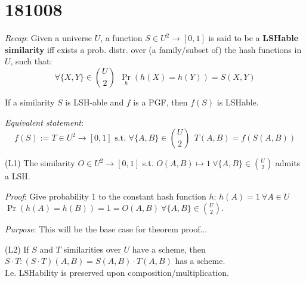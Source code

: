 \section{181008}  %
	
	\textit{Recap}: Given a universe $U$, a function $S \in U^2 \to [0, 1]$ is said to be a \textbf{LSHable similarity} iff exists a prob. distr. over (a family/subset of) the hash functions in $U$, such that: 
	\begin{equation}
	\forall \{X, Y\} \in \binom{U}{2}\ \ \Pr_h(h(X)=h(Y)) = S(X, Y)
	\end{equation}
	
	\thm \label{t:pgf_1} If a similarity $S$ is LSH-able and $f$ is a PGF, then $f(S)$ is LSHable.
	
	\textit{Equivalent statement}:
	\begin{equation}
	f(S) := T \in U^2 \to [0, 1] \text{ s.t. } \forall \{A, B\} \in \binom{U}{2}\ \ T(A, B) = f(S(A, B))
	\end{equation}
	
	
	\lem \label{l:pgf_1} (L1) The similarity $O \in U^2 \to [0, 1]$ s.t. $O(A, B) \mapsto 1 \ \forall \{A, B\} \in \binom{U}{2}$ admits a LSH.
	
	\textit{Proof}: Give probability 1 to the constant hash function $h$: $h(A)=1 \ \forall A\in U$\\
	$\Pr(h(A)=h(B))=1=O(A,B) \ \forall \{A, B\} \in \binom{U}{2}$.
	
	
	\textit{Purpose}: This will be the base case for theorem proof...
	
	\lem \label{l:pgf_2} (L2) If $S$ and $T$ similarities over $U$ have a scheme, then $S \cdot T : (S \cdot T)(A, B) = S(A, B)\cdot T(A, B)$ has a scheme. \\
	I.e. LSHability is preserved upon composition/multiplication.
	
